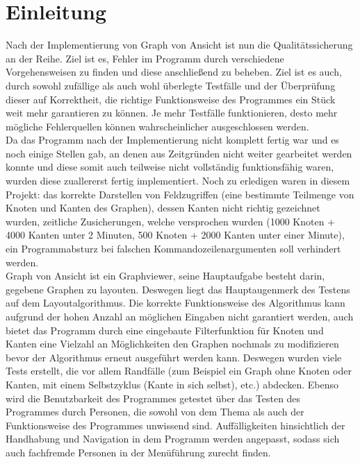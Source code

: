 \chapter{Einleitung}
\label{ch:einleitung}

Nach der Implementierung von Graph von Ansicht ist nun die Qualitätssicherung an der Reihe. Ziel ist es, Fehler im Programm durch verschiedene Vorgehensweisen zu finden und diese anschließend zu beheben. Ziel ist es auch, durch sowohl zufällige als auch wohl überlegte Testfälle und der Überprüfung dieser auf Korrektheit, die richtige Funktionsweise des Programmes ein Stück weit mehr garantieren zu können. Je mehr Testfälle funktionieren, desto mehr mögliche Fehlerquellen können wahrscheinlicher ausgeschlossen werden.\\%
Da das Programm nach der Implementierung nicht komplett fertig war und es noch einige Stellen gab, an denen aus Zeitgründen nicht weiter gearbeitet werden konnte und diese somit auch teilweise nicht vollständig funktionsfähig waren, wurden diese zuallererst fertig implementiert. Noch zu erledigen waren in diesem Projekt: das korrekte Darstellen von Feldzugriffen (eine bestimmte Teilmenge von Knoten und Kanten des Graphen), dessen Kanten nicht richtig gezeichnet wurden, zeitliche Zusicherungen, welche versprochen wurden (1000 Knoten + 4000 Kanten unter 2 Minuten, 500 Knoten + 2000 Kanten unter einer Minute), ein Programmabsturz bei falschen Kommandozeilenargumenten soll verhindert werden.\\
Graph von Ansicht ist ein Graphviewer, seine Hauptaufgabe besteht darin, gegebene Graphen zu layouten. Deswegen liegt das Hauptaugenmerk des Testens auf dem Layoutalgorithmus. Die korrekte Funktionsweise des Algorithmus kann aufgrund der hohen Anzahl an möglichen Eingaben nicht garantiert werden, auch bietet das Programm durch eine eingebaute Filterfunktion für Knoten und Kanten eine Vielzahl an Möglichkeiten den Graphen nochmals zu modifizieren bevor der Algorithmus erneut ausgeführt werden kann. Deswegen wurden viele Tests erstellt, die vor allem Randfälle (zum Beispiel ein Graph ohne Knoten oder Kanten, mit einem Selbstzyklus (Kante in sich selbst), etc.) abdecken.
Ebenso wird die Benutzbarkeit des Programmes getestet über das Testen des Programmes durch Personen, die sowohl von dem Thema als auch der Funktionsweise des Programmes unwissend sind. Auffälligkeiten hinsichtlich der Handhabung und Navigation in dem Programm werden angepasst, sodass sich auch fachfremde Personen in der Menüführung zurecht finden.



